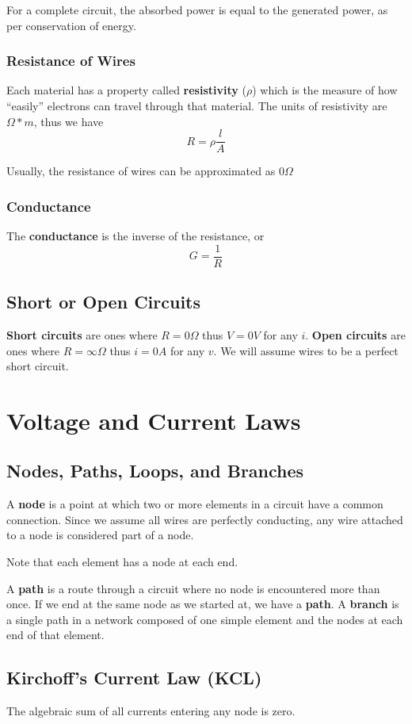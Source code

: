 \documentclass[12pt]{article}
\begin{document}
For a complete circuit, the absorbed power is equal to the generated power, as per conservation of energy.

\subsubsection*{Resistance of Wires}
Each material has a property called {\bf resistivity} ($\rho$) which is the measure of how ``easily'' electrons can travel through that material. The units of resistivity are $\Omega *m$, thus we have \[ R = \rho\frac{l}{A} \]

Usually, the resistance of wires can be approximated as $0 \Omega$

\subsubsection*{Conductance}
The {\bf conductance} is the inverse of the resistance, or \[ G = \frac{1}{R} \]

\subsection*{Short or Open Circuits}
{\bf Short circuits} are ones where $R = 0\Omega$ thus $V = 0V$ for any $i$. {\bf Open circuits} are ones where $R = \infty\Omega$ thus $i = 0A$ for any $v$. We will assume wires to be a perfect short circuit.

\section*{Voltage and Current Laws}
\subsection*{Nodes, Paths, Loops, and Branches}
A {\bf node} is a point at which two or more elements in a circuit have a common connection. Since we assume all wires are perfectly conducting, any wire attached to a node is considered part of a node.

Note that each element has a node at each end.

A {\bf path} is a route through a circuit where no node is encountered more than once. If we end at the same node as we started at, we have a {\bf path}. A {\bf branch} is a single path in a network composed of one simple element and the nodes at each end of that element.

\subsection*{Kirchoff's Current Law (KCL)}
\begin{theorem}[KCL]
The algebraic sum of all currents entering any node is zero.
\end{theorem}
\end{document}
